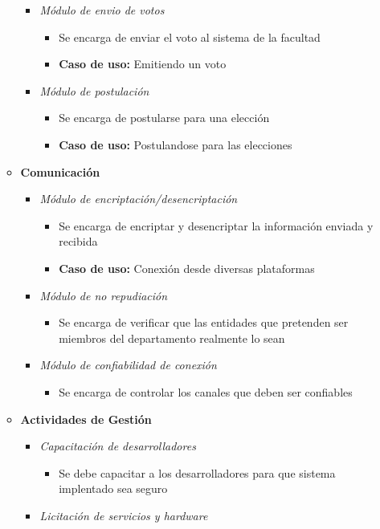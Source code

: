 \begin{itemize}
\begin{itemize}
\begin{itemize}
\begin{itemize}
\end{itemize}
 \item \emph{M\'odulo de envio de votos}
\begin{itemize}
 \item Se encarga de enviar el voto al sistema de la facultad
 \item {\bf Caso de uso:} Emitiendo un voto
\end{itemize}
 \item \emph{M\'odulo de postulación}
\begin{itemize}
 \item Se encarga de postularse para una elección
 \item {\bf Caso de uso:} Postulandose para las elecciones
\end{itemize}
\end{itemize}
 \item {\bf Comunicación}
\begin{itemize}
 \item \emph{M\'odulo de encriptación/desencriptación}
\begin{itemize}
 \item Se encarga de encriptar y desencriptar la información enviada y recibida
 \item {\bf Caso de uso:} Conexión desde diversas plataformas
\end{itemize}
 \item \emph{M\'odulo de no repudiación}
\begin{itemize}
 \item Se encarga de verificar que las entidades que pretenden ser miembros del departamento realmente lo sean
\end{itemize}
 \item \emph{M\'odulo de confiabilidad de conexión}
\begin{itemize}
 \item Se encarga de controlar los canales que deben ser confiables
\end{itemize}
\end{itemize}
 \item {\bf Actividades de Gestión}
\begin{itemize}
 \item \emph{Capacitación de desarrolladores}
\begin{itemize}
 \item Se debe capacitar a los desarrolladores para que sistema implentado sea seguro
\end{itemize}
 \item \emph{Licitación de servicios y hardware}

\end{itemize}
\end{itemize}
\end{itemize}
